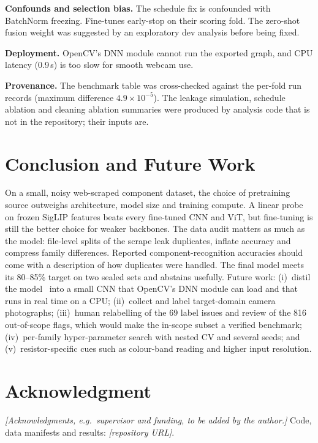 \documentclass[conference]{IEEEtran}
\newcommand{\placeholder}[1]{\textit{[#1]}}
\begin{document}
\textbf{Confounds and selection bias.} The schedule fix is confounded with BatchNorm freezing. Fine-tunes early-stop
on their scoring fold. The zero-shot fusion weight was suggested by an exploratory dev analysis before being fixed.

\textbf{Deployment.} OpenCV's DNN module cannot run the exported graph, and CPU latency (0.9\,s) is too slow for smooth
webcam use.

\textbf{Provenance.} The benchmark table was cross-checked against the per-fold run records (maximum difference
$4.9\times10^{-5}$). The leakage simulation, schedule ablation and cleaning ablation summaries were produced by
analysis code that is not in the repository; their inputs are.

\section{Conclusion and Future Work}\label{sec:conclusion}
On a small, noisy web-scraped component dataset, the choice of pretraining source outweighs architecture, model size
and training compute. A linear probe on frozen SigLIP features beats every fine-tuned CNN and ViT, but fine-tuning is
still the better choice for weaker backbones. The data audit matters as much as the model: file-level splits of the
scrape leak duplicates, inflate accuracy and compress family differences. Reported component-recognition accuracies
should come with a description of how duplicates were handled. The final model meets its 80--85\% target on two
sealed sets and abstains usefully.
Future work: (i)~distil the model~\cite{hinton2015distilling} into a small CNN that OpenCV's DNN module can load and
that runs in real time on a CPU; (ii)~collect and label target-domain camera photographs; (iii)~human relabelling of
the 69 label issues and review of the 816 out-of-scope flags, which would make the in-scope subset a verified
benchmark; (iv)~per-family hyper-parameter search with nested CV and several seeds; and (v)~resistor-specific cues
such as colour-band reading and higher input resolution.

\section*{Acknowledgment}
\placeholder{Acknowledgments, e.g.\ supervisor and funding, to be added by the author.} Code, data manifests and
results: \placeholder{repository URL}.



\end{document}
